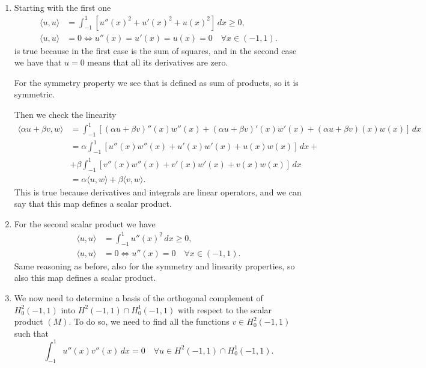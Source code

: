 \begin{enumerate}
    \item Starting with the first one
    \[
        \begin{aligned}
            \langle u, u \rangle &= \int_{-1}^1 \left[ u''(x)^2 + u'(x)^2 + u(x)^2 \right] \, dx \geq 0, \\
            \langle u, u \rangle &= 0 \iff u''(x) = u'(x) = u(x) = 0 \quad \forall x \in (-1, 1).
        \end{aligned}
    \]
    is true because in the first case is the sum of squares, and in the second case we have that \(u = 0\) means that all its derivatives are zero. 

    For the symmetry property we see that is defined as sum of products, so it is symmetric.

    Then we check the linearity 
    \[
        \begin{aligned}
            \langle \alpha u + \beta v, w \rangle &= \int_{-1}^1 \left[ (\alpha u + \beta v)''(x) w''(x) + (\alpha u + \beta v)'(x) w'(x) + (\alpha u + \beta v)(x) w(x) \right] \, dx \\
            &= \alpha \int_{-1}^1 \left[ u''(x) w''(x) + u'(x) w'(x) + u(x) w(x) \right] \, dx +\\
            &+ \beta \int_{-1}^1 \left[ v''(x) w''(x) + v'(x) w'(x) + v(x) w(x) \right] \, dx \\
            &= \alpha \langle u, w \rangle + \beta \langle v, w \rangle.
        \end{aligned}
    \]
    This is true because derivatives and integrals are linear operators, and we can say that this map defines a scalar product.
    \item For the second scalar product we have
    \[
        \begin{aligned}
            \langle u, u \rangle &= \int_{-1}^1 u''(x)^2 \, dx \geq 0, \\
            \langle u, u \rangle &= 0 \iff u''(x) = 0 \quad \forall x \in (-1, 1).
        \end{aligned}
    \]
    Same reasoning as before, also for the symmetry and linearity properties, so also this map defines a scalar product.
    \item We now need to determine a basis of the orthogonal complement of \(H^2_0(-1, 1)\) into \(H^2(-1, 1)\cap H^1_0(-1, 1)\) with respect to the scalar product \((M)\). 
    To do so, we need to find all the functions \(v \in H^2_0(-1, 1)\) such that
    \[
        \int_{-1}^1 u''(x) v''(x) \, dx = 0 \quad \forall u \in H^2(-1, 1)\cap H^1_0(-1, 1).
\]
\end{enumerate}

